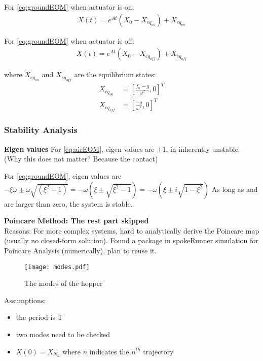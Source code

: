 For \eqref{eq:groundEOM} when actuator is on:
\begin{align}
\label{eq:groundEOMsol}
X(t) = e^{At}(X_0-X_{eq_{on}}) + X_{eq_{on}}
\end{align}

For \eqref{eq:groundEOM} when actuator is off:
\begin{align}
\label{eq:groundEOMsol2}
X(t) = e^{At}(X_0-X_{eq_{off}}) + X_{eq_{off}}
\end{align}

where $X_{eq_{on}}$ and $X_{eq_{off}}$ are the equilibrium states:
\begin{align}
\label{eq:eqStates}
X_{eq_{on}} &= [\frac{f_n-g}{\omega^2}, 0]^T\\
X_{eq_{off}}&= [\frac{-g}{\omega^2}, 0]^T
\end{align}

\subsubsection{Stability Analysis}
\textbf{Eigen values}
For \eqref{eq:airEOM}, eigen values are $\pm 1$, in inherently unstable. (Why this does not matter? Because the contact)

\noindent For \eqref{eq:groundEOM}, eigen values are
$-\xi\omega \pm \omega\sqrt{(\xi^2-1)} = -\omega(\xi \pm \sqrt{\xi^2 -1}) = -\omega(\xi \pm i\sqrt{1-\xi^2 })$ As long as \omega  and \xi are larger than zero, the system is stable.\\

\pagebreak

\noindent\textbf{Poincare Method: The rest part skipped}\\
Reasons: For more complex systems, hard to analytically derive the Poincare map (usually no closed-form solution). Found a package in spokeRunner simulation for Poincare Analysis (numerically), plan to reuse it.

\begin{figure}[H]
\centering

\texttt{[image: modes.pdf]} 
\caption{The modes of the hopper \cite{Cham2002}}
\label{fig.modes}
\end{figure}

Assumptions:
\begin{itemize}
\item the period is T
\item two modes need to be checked
\item $X(0) = X_{N_n}$ where $n$ indicates the $n^{th}$ trajectory
\end{itemize}

